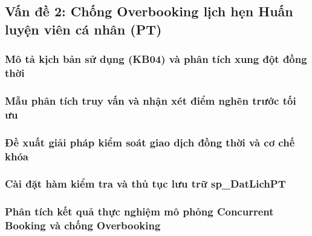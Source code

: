 \subsection{Vấn đề 2: Chống Overbooking lịch hẹn Huấn luyện viên cá nhân (PT)}

\subsubsection{Mô tả kịch bản sử dụng (KB04) và phân tích xung đột đồng thời}

\subsubsection{Mẫu phân tích truy vấn và nhận xét điểm nghẽn trước tối ưu}

\subsubsection{Đề xuất giải pháp kiểm soát giao dịch đồng thời và cơ chế khóa}

\subsubsection{Cài đặt hàm kiểm tra và thủ tục lưu trữ sp\_DatLichPT}

\subsubsection{Phân tích kết quả thực nghiệm mô phỏng Concurrent Booking và chống Overbooking}
